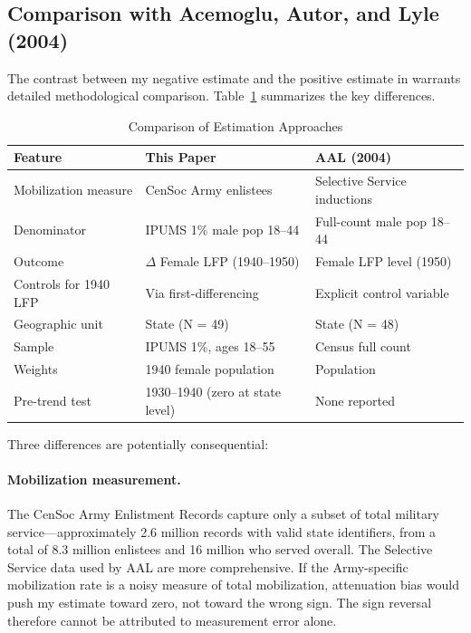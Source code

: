 \documentclass[12pt]{article}
\begin{document}
\subsection{Comparison with Acemoglu, Autor, and Lyle (2004)}

The contrast between my negative estimate and the positive estimate in \citet{acemoglu2004women} warrants detailed methodological comparison. Table~\ref{tab:comparison} summarizes the key differences.

\begin{table}[htbp]
\centering
\caption{Comparison of Estimation Approaches}
\label{tab:comparison}
\small
\begin{tabular}{lll}
\hline\hline
Feature & This Paper & AAL (2004) \\
\hline
Mobilization measure & CenSoc Army enlistees & Selective Service inductions \\
Denominator & IPUMS 1\% male pop 18--44 & Full-count male pop 18--44 \\
Outcome & $\Delta$ Female LFP (1940--1950) & Female LFP level (1950) \\
Controls for 1940 LFP & Via first-differencing & Explicit control variable \\
Geographic unit & State (N = 49) & State (N = 48) \\
Sample & IPUMS 1\%, ages 18--55 & Census full count \\
Weights & 1940 female population & Population \\
Pre-trend test & 1930--1940 (zero at state level) & None reported \\
\hline\hline
\end{tabular}
\end{table}

Three differences are potentially consequential:

\paragraph{Mobilization measurement.} The CenSoc Army Enlistment Records capture only a subset of total military service---approximately 2.6 million records with valid state identifiers, from a total of 8.3 million enlistees and 16 million who served overall. The Selective Service data used by AAL are more comprehensive. If the Army-specific mobilization rate is a noisy measure of total mobilization, attenuation bias would push my estimate toward zero, not toward the wrong sign. The sign reversal therefore cannot be attributed to measurement error alone.
\end{document}
